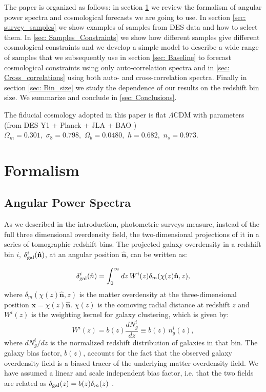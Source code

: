 \documentclass[a4paper,fleqn,usenatbib]{mnras}
\begin{document}
The paper is organized as follows:  in section \ref{sec: formalism} we review the formalism of  angular power spectra and cosmological forecasts we are going to use. In section \ref{sec: survey_samples} we show examples of samples from DES data and how to select them. In \ref{sec: Samples_Constraints} we show how different samples give different cosmological constraints and we develop a simple model to describe a wide range of samples that we subsequently use in section \ref{sec: Baseline} to forecast cosmological constraints using only auto-correlation spectra and in \ref{sec: Cross_correlations} using both auto- and cross-correlation spectra. Finally in section \ref{sec: Bin_size} we study the dependence of our results on the redshift bin size. We summarize and conclude in \ref{sec: Conclusions}.

The fiducial cosmology adopted in this paper is flat $\Lambda$CDM with parameters (from DES Y1 + Planck + JLA + BAO \citep[TABLE II]{DES1}) $\Omega_m = 0.301, \,\,\sigma_8 = 0.798, \,\, \Omega_b = 0.0480, \,\, h = 0.682, \,\, n_s = 0.973$. 



\section{Formalism}
\label{sec: formalism} %


\subsection{Angular Power Spectra}
\label{subsec: APS}

As we described in the introduction, photometric surveys measure, instead of the full three dimensional overdensity  field, the  two-dimensional projections of it in a series of tomographic redshift bins. The projected galaxy overdensity in a redshift bin $i$, $\delta^i_{\mbox{\scriptsize{gal}}}(\mathbf{\hat{n}})$, at an angular position $\mathbf{\hat{n}}$, can be written as:

\begin{equation}
\delta^i_{\mbox{\scriptsize{gal}}}(\hat{n})  = \int_0^\infty  dz\, W^i(z) \delta_m(\chi(z)\mathbf{\hat{n}},z),
\end{equation}
where  $\delta_m(\chi(z)\mathbf{\hat{n}},z)$  is the matter overdensity at the three-dimensional position $\mathbf{x} = \chi (z)\mathbf{\hat{n}}$.  $\chi(z)$ is the comoving radial distance at redshift $z$ and $W^{i}(z)$ is the weighting kernel for galaxy clustering, which is given by:
\begin{equation}
W^{i}(z) = b(z)\frac{dN_g^i}{dz} \equiv b(z)\,n^i_g(z),
\end{equation}
where $dN_g^i/dz$ is the normalized redshift distribution of galaxies in that bin. The galaxy bias factor, $b(z)$, accounts for the fact that the observed galaxy overdensity field is a biased tracer of the underlying matter overdensity field.  We have assumed a linear and scale independent bias factor, i.e. that the two fields are related as $\delta_{\mbox{\scriptsize{gal}}} (z) = b(z) \delta_m(z)$ \citep{Fry1993}.
\end{document}
